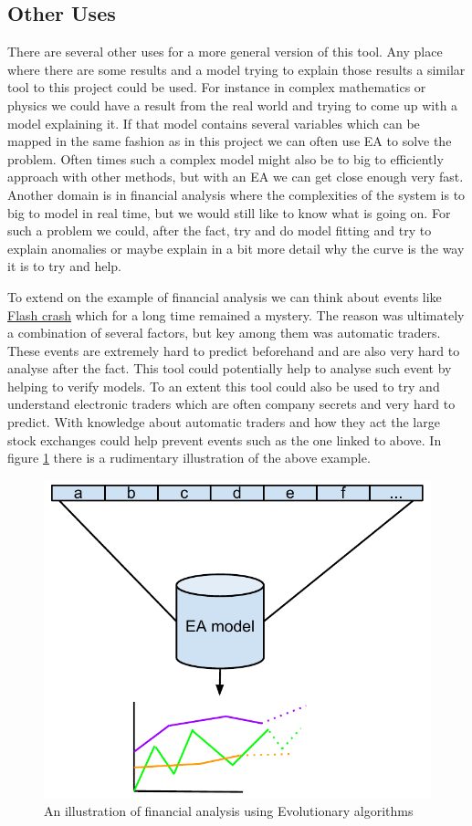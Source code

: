 \subsection{Other Uses}\label{sec:other-uses}
There are several other uses for a more general version of this tool. Any place
where there are some results and a model trying to explain those results a
similar tool to this project could be used. For instance in complex mathematics
or physics we could have a result from the real world and trying to come up with
a model explaining it. If that model contains several variables which can be
mapped in the same fashion as in this project we can often use EA to solve the
problem. Often times such a complex model
might also be to big to efficiently approach with other methods, but with an EA
we can get close enough very fast. Another domain is in financial analysis where
the complexities of the system is to big to model in real time, but we would
still like to know what is going on. For such a problem we could, after the
fact, try and do model fitting and try to explain anomalies or maybe explain in
a bit more detail why the curve is the way it is to try and help.

To extend on the example of financial analysis we can think about events like
\href{http://en.wikipedia.org/wiki/Flash_crash}{Flash crash} which for a long
time remained a mystery. The reason was ultimately a combination of several
factors, but key among them was automatic traders. These events are extremely
hard to predict beforehand and are also very hard to analyse after the fact.
This tool could potentially help to analyse such event by helping to verify
models. To an extent this tool could also be used to try and understand
electronic traders which are often company secrets and very hard to predict.
With knowledge about automatic traders and how they act the large stock exchanges could help
prevent events such as the one linked to above. In figure \ref{fig:ea-financial}
there is a rudimentary illustration of the above example.

\begin{figure}
	\centering
	\includegraphics{ea-model.pdf}
	\caption{An illustration of financial analysis using Evolutionary
	algorithms}
	\label{fig:ea-financial}
\end{figure}
